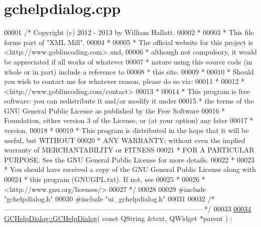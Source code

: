 \hypertarget{gchelpdialog_8cpp_source}{\section{gchelpdialog.\-cpp}
}

\begin{DoxyCode}
00001 \textcolor{comment}{/* Copyright (c) 2012 - 2013 by William Hallatt.}
00002 \textcolor{comment}{ *}
00003 \textcolor{comment}{ * This file forms part of "XML Mill".}
00004 \textcolor{comment}{ *}
00005 \textcolor{comment}{ * The official website for this project is <http://www.goblincoding.com> and,}
00006 \textcolor{comment}{ * although not compulsory, it would be appreciated if all works of whatever}
00007 \textcolor{comment}{ * nature using this source code (in whole or in part) include a reference to}
00008 \textcolor{comment}{ * this site.}
00009 \textcolor{comment}{ *}
00010 \textcolor{comment}{ * Should you wish to contact me for whatever reason, please do so via:}
00011 \textcolor{comment}{ *}
00012 \textcolor{comment}{ *                 <http://www.goblincoding.com/contact>}
00013 \textcolor{comment}{ *}
00014 \textcolor{comment}{ * This program is free software: you can redistribute it and/or modify it
       under}
00015 \textcolor{comment}{ * the terms of the GNU General Public License as published by the Free
       Software}
00016 \textcolor{comment}{ * Foundation, either version 3 of the License, or (at your option) any later}
00017 \textcolor{comment}{ * version.}
00018 \textcolor{comment}{ *}
00019 \textcolor{comment}{ * This program is distributed in the hope that it will be useful, but WITHOUT}
00020 \textcolor{comment}{ * ANY WARRANTY; without even the implied warranty of MERCHANTABILITY or
       FITNESS}
00021 \textcolor{comment}{ * FOR A PARTICULAR PURPOSE.  See the GNU General Public License for more
       details.}
00022 \textcolor{comment}{ *}
00023 \textcolor{comment}{ * You should have received a copy of the GNU General Public License along with}
00024 \textcolor{comment}{ * this program (GNUGPL.txt).  If not, see}
00025 \textcolor{comment}{ *}
00026 \textcolor{comment}{ *                    <http://www.gnu.org/licenses/>}
00027 \textcolor{comment}{ */}
00028 
00029 \textcolor{preprocessor}{#include "gchelpdialog.h"}
00030 \textcolor{preprocessor}{#include "ui\_gchelpdialog.h"}
00031 
00032 \textcolor{comment}{/*
      --------------------------------------------------------------------------------------*/}
00033 
\hypertarget{gchelpdialog_8cpp_source_l00034}{}\hyperlink{class_g_c_help_dialog_ab50a71cb98a1d9375288703bcd1e3be1}{00034} \hyperlink{class_g_c_help_dialog_ab50a71cb98a1d9375288703bcd1e3be1}{GCHelpDialog::GCHelpDialog}( \textcolor{keyword}{const} QString &text, QWidget *parent ) :

\end{DoxyCode}
